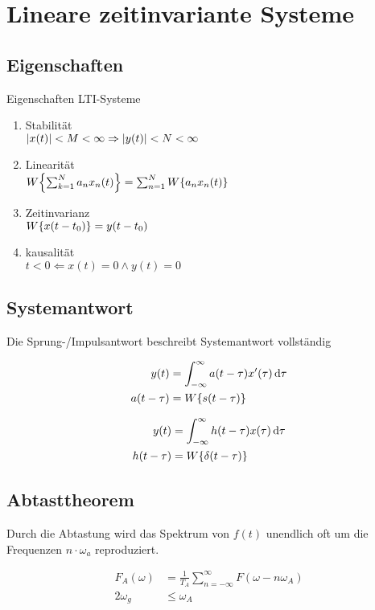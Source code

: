 \documentclass[10pt,a4paper]{article}
\begin{document}
\twocolumn
\pagestyle{fancy}
\section{Lineare zeitinvariante Systeme}
  \subsection{Eigenschaften}
  Eigenschaften LTI-Systeme
  \begin{mdframed}[style=exercise]
    \begin{enumerate}
      \item Stabilität\\
      \(\abs{x(t)} < M < \infty \Rightarrow \abs{y(t)} < N < \infty\)
      \item Linearität\\
      \(W\qty{\sum_{k=1}^{N}a_n x_n(t)}=\sum_{n=1}^{N}W\qty{a_n x_n(t)}\)
      \item Zeitinvarianz\\
      \(W\qty{x(t-t_0)} =y(t-t_0)\)
      \item kausalität\\
      $t < 0 \Leftarrow x(t)=0 \land y(t)=0$
    \end{enumerate}
  \end{mdframed}
  \subsection{Systemantwort}
  Die Sprung-/Impulsantwort beschreibt Systemantwort vollständig
  \begin{mdframed}[style=exercise]
    \begin{align}
      y(t) &= \int^{\infty}_{-\infty} a(t-\tau) x'(\tau) \dd{\tau}\\
      a(t-\tau) &= W\qty{s(t-\tau)}\nonumber
    \end{align}
  \end{mdframed}
  \begin{mdframed}[style=exercise]
    \begin{align}
      y(t) &= \int_{-\infty}^{\infty} h(t-\tau) x(\tau) \dd{\tau}\\
      h(t-\tau) &= W\qty{\delta(t-\tau)}\nonumber
    \end{align}
  \end{mdframed}
  \subsection{Abtasttheorem}
  Durch die Abtastung wird das Spektrum von $f(t)$ unendlich oft um die Frequenzen $n\cdot \omega_a$ reproduziert.
  \begin{mdframed}[style=exercise]
    \begin{align}
      F_A(\omega) &= \frac{1}{T_A} \sum_{n=-\infty}^{\infty} F(\omega-n\omega_A)\\
      2\omega_g &\leq \omega_A\nonumber
    \end{align}
  \end{mdframed}
\end{document}
